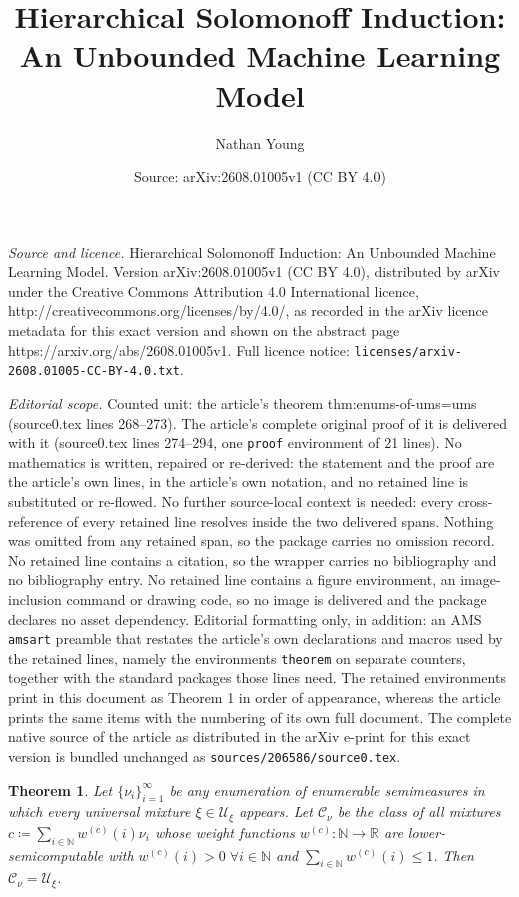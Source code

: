\documentclass[10pt,a4paper]{amsart}
\title{Hierarchical Solomonoff Induction: An Unbounded Machine Learning Model}
\author{Nathan Young}
\date{Source: arXiv:2608.01005v1 (CC BY 4.0)}
\newtheorem{theorem}{Theorem}
\begin{document}
\maketitle

\noindent\emph{Source and licence.} Hierarchical Solomonoff Induction: An Unbounded Machine Learning Model. Version arXiv:2608.01005v1 (CC BY 4.0), distributed by arXiv under the Creative Commons Attribution 4.0 International licence, http://creativecommons.org/licenses/by/4.0/, as recorded in the arXiv licence metadata for this exact version and shown on the abstract page https://arxiv.org/abs/2608.01005v1. Full licence notice: \texttt{licenses/arxiv-2608.01005-CC-BY-4.0.txt}.\par\smallskip

\noindent\textit{Editorial scope.} Counted unit: the article's theorem thm:enums-of-ums=ums (source0.tex lines 268--273). The article's complete original proof of it is delivered with it (source0.tex lines 274--294, one \texttt{proof} environment of 21 lines). No mathematics is written, repaired or re-derived: the statement and the proof are the article's own lines, in the article's own notation, and no retained line is substituted or re-flowed.  No further source-local context is needed: every cross-reference of every retained line resolves inside the two delivered spans.  Nothing was omitted from any retained span, so the package carries no omission record.  No retained line contains a citation, so the wrapper carries no bibliography and no bibliography entry.  No retained line contains a figure environment, an image-inclusion command or drawing code, so no image is delivered and the package declares no asset dependency.  Editorial formatting only, in addition: an AMS \texttt{amsart} preamble that restates the article's own declarations and macros used by the retained lines, namely the environments \texttt{theorem} on separate counters, together with the standard packages those lines need.  The retained environments print in this document as Theorem 1 in order of appearance, whereas the article prints the same items with the numbering of its own full document.  The complete native source of the article as distributed in the arXiv e-print for this exact version is bundled unchanged as \texttt{sources/206586/source0.tex}.
\begin{theorem}
\label{thm:enums-of-ums=ums}
Let $\{\nu_i\}_{i=1}^\infty$ be any enumeration of enumerable semimeasures in which every universal mixture $\xi\in\mathcal{U}_\xi$ appears.
Let $\mathcal{C}_\nu$ be the class of all mixtures $c\coloneq\sum_{i\in\mathbb{N}} w^{(c)}(i)\nu_i$ whose weight functions $w^{(c)}:\mathbb{N}\to\mathbb{R}$ are lower-semicomputable with $w^{(c)}(i)>0\;\forall i\in\mathbb{N}$ and $\sum_{i\in\mathbb{N}}w^{(c)}(i)\leq1$.
Then $\mathcal{C}_\nu=\mathcal{U}_\xi$.
\end{theorem}
\end{document}
